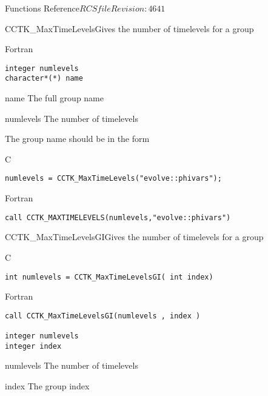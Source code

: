\begin{cactuspart}{ Functions Reference}{$RCSfile$}{$Revision: 4641 $}
\begin{FunctionDescription}{CCTK\_MaxTimeLevels}{Gives the number of timelevels for a group}
\begin{SynopsisSection}
\begin{Synopsis}{Fortran}
\begin{verbatim}
integer numlevels
character*(*) name\end{verbatim}
\end{Synopsis}
\end{SynopsisSection}
\begin{ParameterSection}
\begin{Parameter}{name}
The full group name
\end{Parameter}
\begin{Parameter}{numlevels}
The number of timelevels
\end{Parameter}
\end{ParameterSection}
\begin{Discussion}
The group name should be in the form 
\end{Discussion}
\begin{ExampleSection}
\begin{Example}{C}
\begin{verbatim}
numlevels = CCTK_MaxTimeLevels("evolve::phivars");
\end{verbatim}
\end{Example}
\begin{Example}{Fortran}
\begin{verbatim}
call CCTK_MAXTIMELEVELS(numlevels,"evolve::phivars")
\end{verbatim}
\end{Example}
\end{ExampleSection}
\end{FunctionDescription}

\begin{FunctionDescription}{CCTK\_MaxTimeLevelsGI}{Gives the number of timelevels for a group}
\label{CCTK-MaxTimeLevelsGI}
\begin{SynopsisSection}
\begin{Synopsis}{C}
\begin{verbatim}int numlevels = CCTK_MaxTimeLevelsGI( int index)\end{verbatim}
\end{Synopsis}
\begin{Synopsis}{Fortran}
\begin{verbatim}call CCTK_MaxTimeLevelsGI(numlevels , index )

integer numlevels
integer index\end{verbatim}
\end{Synopsis}
\end{SynopsisSection}
\begin{ParameterSection}
\begin{Parameter}{numlevels}
The number of timelevels
\end{Parameter}
\begin{Parameter}{index}
The group index
\end{Parameter}
\end{ParameterSection}


\end{FunctionDescription}
\end{cactuspart}
